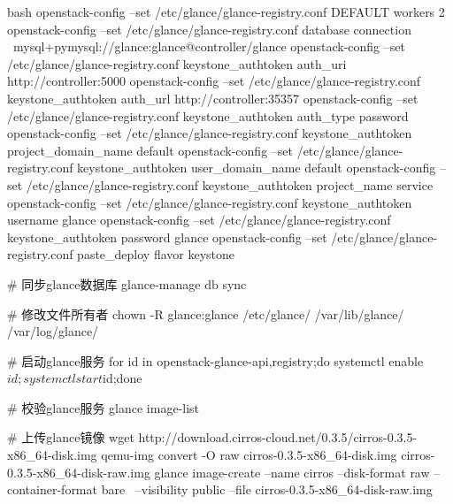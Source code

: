 \begin{code-block}{bash}
openstack-config --set /etc/glance/glance-registry.conf DEFAULT workers 2
openstack-config --set /etc/glance/glance-registry.conf database connection \
    mysql+pymysql://glance:glance@controller/glance
openstack-config --set /etc/glance/glance-registry.conf keystone_authtoken auth_uri http://controller:5000
openstack-config --set /etc/glance/glance-registry.conf keystone_authtoken auth_url http://controller:35357
openstack-config --set /etc/glance/glance-registry.conf keystone_authtoken auth_type password
openstack-config --set /etc/glance/glance-registry.conf keystone_authtoken project_domain_name default
openstack-config --set /etc/glance/glance-registry.conf keystone_authtoken user_domain_name default
openstack-config --set /etc/glance/glance-registry.conf keystone_authtoken project_name service
openstack-config --set /etc/glance/glance-registry.conf keystone_authtoken username glance
openstack-config --set /etc/glance/glance-registry.conf keystone_authtoken password glance
openstack-config --set /etc/glance/glance-registry.conf paste_deploy flavor keystone

# 同步glance数据库
glance-manage db sync

# 修改文件所有者
chown -R glance:glance /etc/glance/ /var/lib/glance/ /var/log/glance/

# 启动glance服务
for id in openstack-glance-{api,registry};do systemctl enable $id;systemctl start $id;done

# 校验glance服务
glance image-list

# 上传glance镜像
wget http://download.cirros-cloud.net/0.3.5/cirros-0.3.5-x86_64-disk.img
qemu-img convert -O raw cirros-0.3.5-x86_64-disk.img cirros-0.3.5-x86_64-disk-raw.img
glance image-create --name cirros --disk-format raw --container-format bare \
    --visibility public --file cirros-0.3.5-x86_64-disk-raw.img
\end{code-block}

